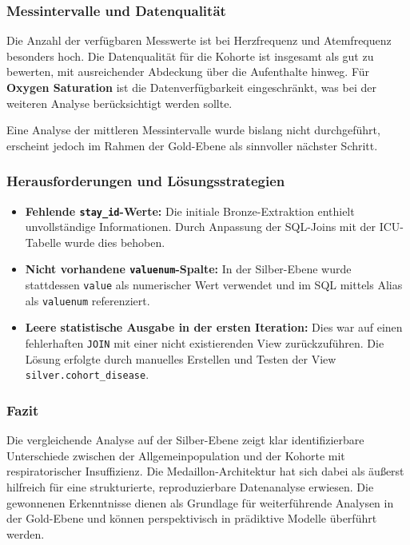 \documentclass[12pt]{article}
\begin{document}
\subsubsection{Messintervalle und Datenqualität}

Die Anzahl der verfügbaren Messwerte ist bei Herzfrequenz und Atemfrequenz besonders hoch. Die Datenqualität für die Kohorte ist insgesamt als gut zu bewerten, mit ausreichender Abdeckung über die Aufenthalte hinweg. Für \textbf{Oxygen Saturation} ist die Datenverfügbarkeit eingeschränkt, was bei der weiteren Analyse berücksichtigt werden sollte.

Eine Analyse der mittleren Messintervalle wurde bislang nicht durchgeführt, erscheint jedoch im Rahmen der Gold-Ebene als sinnvoller nächster Schritt.

\subsubsection{Herausforderungen und Lösungsstrategien}

\begin{itemize}
    \item \textbf{Fehlende \texttt{stay\_id}-Werte:} Die initiale Bronze-Extraktion enthielt unvollständige Informationen. Durch Anpassung der SQL-Joins mit der ICU-Tabelle wurde dies behoben.
    \item \textbf{Nicht vorhandene \texttt{valuenum}-Spalte:} In der Silber-Ebene wurde stattdessen \texttt{value} als numerischer Wert verwendet und im SQL mittels Alias als \texttt{valuenum} referenziert.
    \item \textbf{Leere statistische Ausgabe in der ersten Iteration:} Dies war auf einen fehlerhaften \texttt{JOIN} mit einer nicht existierenden View zurückzuführen. Die Lösung erfolgte durch manuelles Erstellen und Testen der View \texttt{silver.cohort\_disease}.
\end{itemize}

\subsubsection{Fazit}

Die vergleichende Analyse auf der Silber-Ebene zeigt klar identifizierbare Unterschiede zwischen der Allgemeinpopulation und der Kohorte mit respiratorischer Insuffizienz. Die Medaillon-Architektur hat sich dabei als äußerst hilfreich für eine strukturierte, reproduzierbare Datenanalyse erwiesen. Die gewonnenen Erkenntnisse dienen als Grundlage für weiterführende Analysen in der Gold-Ebene und können perspektivisch in prädiktive Modelle überführt werden.
\end{document}
